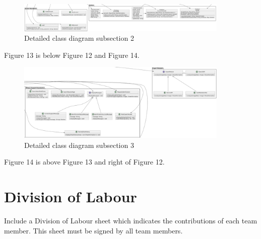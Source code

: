 \documentclass[]{article}
\begin{document}
\begin{figure}[H]
    \centering
    \includegraphics[width=0.9\textwidth]{figure2.png}
	\caption{Detailed class diagram subsection 2}
\end{figure}
Figure 13 is below Figure 12 and Figure 14.

\begin{figure}[H]
    \centering
    \includegraphics[width=0.9\textwidth]{figure3.png}
	\caption{Detailed class diagram subsection 3}
\end{figure}
Figure 14 is above Figure 13 and right of Figure 12.


\appendix
\section{Division of Labour}
\label{sec:division_of_labour}
Include a Division of Labour sheet which indicates the contributions of each team member. This sheet must be signed by all team members.

\newpage
\end{document}
